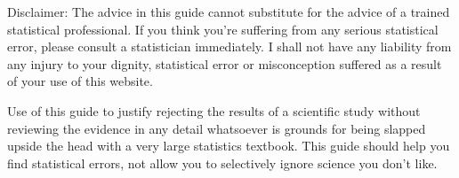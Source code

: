 Disclaimer: The advice in this guide cannot substitute for the advice of a trained statistical professional. If you think you’re suffering from any serious statistical error, please consult a statistician immediately. I shall not have any liability from any injury to your dignity, statistical error or misconception suffered as a result of your use of this website.

Use of this guide to justify rejecting the results of a scientific study without reviewing the evidence in any detail whatsoever is grounds for being slapped upside the head with a very large statistics textbook. This guide should help you find statistical errors, not allow you to selectively ignore science you don’t like.